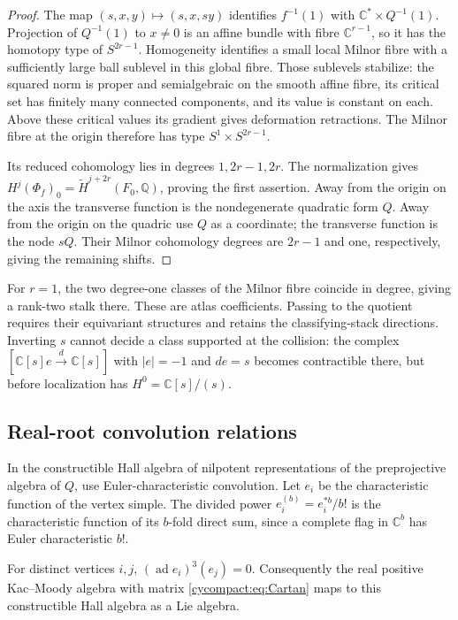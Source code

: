 \begin{proof}
The map $(s,x,y)\mapsto(s,x,sy)$ identifies $f^{-1}(1)$
with $\mathbb C^*\times Q^{-1}(1)$. Projection of
$Q^{-1}(1)$ to $x\ne0$ is an affine bundle with fibre
$\mathbb C^{r-1}$, so it has the homotopy type of
$S^{2r-1}$. Homogeneity identifies a small local Milnor
fibre with a sufficiently large ball sublevel in this
global fibre. Those sublevels stabilize: the squared
norm is proper and semialgebraic on the smooth affine
fibre, its critical set has finitely many connected
components, and its value is constant on each.
Above these critical values its gradient gives
deformation retractions. The Milnor fibre at the
origin therefore has type $S^1\times S^{2r-1}$.

Its reduced cohomology lies in degrees $1,2r-1,2r$.
The normalization gives
$H^j(\Phi_f)_0=\widetilde H^{j+2r}(F_0,\mathbb Q)$,
proving the first assertion. Away from the origin
on the axis the transverse function is the
nondegenerate quadratic form $Q$. Away from the
origin on the quadric use $Q$ as a coordinate;
the transverse function is the node $sQ$.
Their Milnor cohomology degrees are $2r-1$ and one,
respectively, giving the remaining shifts.
\end{proof}

For $r=1$, the two degree-one classes of the Milnor
fibre coincide in degree, giving a rank-two stalk
there. These are atlas coefficients. Passing to
the quotient requires their equivariant structures
and retains the classifying-stack directions.
Inverting $s$ cannot decide a class supported at
the collision: the complex
$[\mathbb C[s]e\xrightarrow{d}\mathbb C[s]]$ with
$|e|=-1$ and $de=s$ becomes contractible there,
but before localization has $H^0=\mathbb C[s]/(s)$.

\subsection{Real-root convolution relations}

In the constructible Hall algebra of nilpotent
representations of the preprojective algebra of $Q$,
use Euler-characteristic convolution. Let $e_i$ be
the characteristic function of the vertex simple.
The divided power $e_i^{(b)}=e_i^{*b}/b!$ is the
characteristic function of its $b$-fold direct sum,
since a complete flag in $\mathbb C^b$ has Euler
characteristic $b!$.

\begin{proposition}\label{cycompact:prop:Serre}
For distinct vertices $i,j$,
$(\operatorname{ad}e_i)^3(e_j)=0$.
Consequently the real positive Kac--Moody algebra
with matrix \eqref{cycompact:eq:Cartan} maps to
this constructible Hall algebra as a Lie algebra.
\end{proposition}

